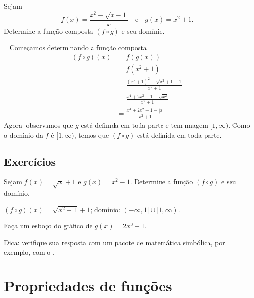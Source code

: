 \documentclass[../main.tex]{subfiles}
\begin{document}
\begin{exeresol}
  Sejam
  \begin{equation*}
    f(x) = \frac{x^2 - \sqrt{x-1}}{x}\quad\text{e}\quad g(x) = x^2 + 1.
  \end{equation*}
  Determine a função composta $(f\circ g)$ e seu domínio.
  \begin{resol}~
  Começamos determinando a função composta
  \begin{align*}
    (f\circ g)(x) &= f(g(x))\\
                  &= f(x^2 + 1)\\
                  &= \frac{(x^2 + 1)^2 - \sqrt{x^2+1-1}}{x^2 + 1}\\
                  &= \frac{x^4 + 2x^2 + 1 - \sqrt{x^2}}{x^2 + 1}\\
                  &= \frac{x^4 + 2x^2 + 1 - |x|}{x^2 + 1}
  \end{align*}
  Agora, observamos que $g$ está definida em toda parte e tem imagem $[1, \infty)$. Como o domínio da $f$ é $[1, \infty)$, temos que $(f\circ g)$ está definida em toda parte.
\end{resol}
\end{exeresol}

\subsection{Exercícios}
\begin{exer}
  Sejam $f(x) = \sqrt{x}+1$ e $g(x) = x^2 -1$. Determine a função $(f\circ g)$ e seu domínio.
\end{exer}
\begin{resp}
  $(f\circ g)(x) = \sqrt{x^2-1}+1$; domínio: $(-\infty, 1]\cup [1, \infty)$.
\end{resp}

\begin{exer}
  Faça um esboço do gráfico de $g(x) = 2x^3 - 1$.
\end{exer}
\begin{resp}
  Dica: verifique sua resposta com um pacote de matemática simbólica, por exemplo, com o \geogebra.
\end{resp}

\section{Propriedades de funções}\label{cap_funcao_sec_funprop}
\end{document}

